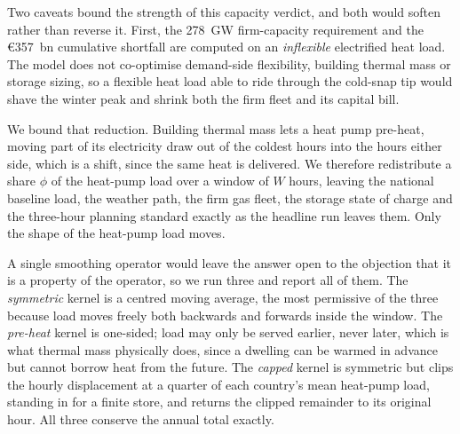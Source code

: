 Two caveats bound the strength of this capacity verdict, and both would soften rather
than reverse it. First, the 278~GW firm-capacity requirement and the
\euro{}357~bn cumulative shortfall are computed on an \emph{inflexible} electrified heat load.
The model does not co-optimise demand-side flexibility, building thermal mass or
storage sizing, so a flexible heat load able to ride through the cold-snap tip would
shave the winter peak and shrink both the firm fleet and its capital bill.

We bound that reduction. Building thermal mass lets a heat pump pre-heat, moving part of
its electricity draw out of the coldest hours into the hours either side, which is a shift, since the same heat is delivered. We therefore redistribute
a share $\phi$ of the heat-pump load over a window of $W$ hours, leaving the national
baseline load, the weather path, the firm gas fleet, the storage state of charge and the
three-hour planning standard exactly as the headline run leaves them. Only the shape of
the heat-pump load moves.

A single smoothing operator would leave the answer open to the objection that it is a
property of the operator, so we run three and report all of them. The
\emph{symmetric} kernel is a centred moving average, the most permissive of the three
because load moves freely both backwards and forwards inside the window. The
\emph{pre-heat} kernel is one-sided; load may only be served earlier, never later, which
is what thermal mass physically does, since a dwelling can be warmed in advance but
cannot borrow heat from the future. The \emph{capped} kernel is symmetric but clips the
hourly displacement at a quarter of each country's mean heat-pump load, standing in for a
finite store, and returns the clipped remainder to its original hour. All three conserve
the annual total exactly.

